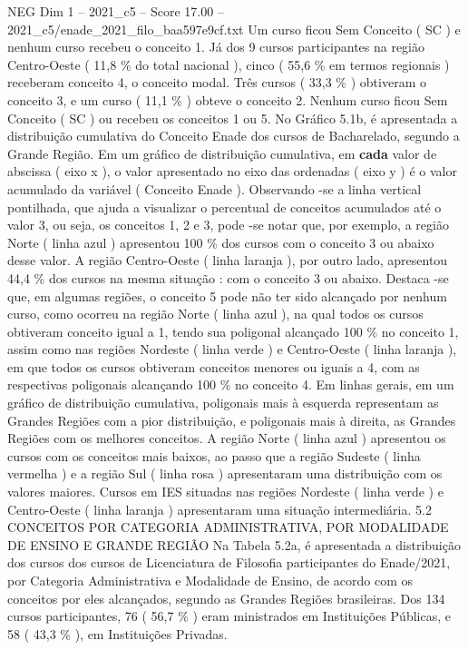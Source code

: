 \begin{textsample}{NEG Dim 1 – 2021\_c5 – Score 17.00 – 2021\_c5/enade\_2021\_filo\_baa597e9cf.txt}
Um curso ficou Sem Conceito ( SC ) e nenhum curso recebeu o conceito 1.
Já dos 9 cursos participantes na região Centro-Oeste ( 11,8 \% do total nacional ), cinco ( 55,6 \% em termos regionais ) receberam conceito 4, o conceito modal.
Três cursos ( 33,3 \% ) obtiveram o conceito 3, e um curso ( 11,1 \% ) obteve o conceito 2.
Nenhum curso ficou Sem Conceito ( SC ) ou recebeu os conceitos 1 ou 5.
No Gráfico 5.1b, é apresentada a distribuição cumulativa do Conceito Enade dos cursos de Bacharelado, segundo a Grande Região.
Em um gráfico de distribuição cumulativa, em \textbf{cada} valor de abscissa ( eixo x ), o valor apresentado no eixo das ordenadas ( eixo y ) é o valor acumulado da variável ( Conceito Enade ).
Observando -se a linha vertical pontilhada, que ajuda a visualizar o percentual de conceitos acumulados até o valor 3, ou seja, os conceitos 1, 2 e 3, pode -se notar que, por exemplo, a região Norte ( linha azul ) apresentou 100 \% dos cursos com o conceito 3 ou abaixo desse valor.
A região Centro-Oeste ( linha laranja ), por outro lado, apresentou 44,4 \% dos cursos na mesma situação : com o conceito 3 ou abaixo.
Destaca -se que, em algumas regiões, o conceito 5 pode não ter sido alcançado por nenhum curso, como ocorreu na região Norte ( linha azul ), na qual todos os cursos obtiveram conceito igual a 1, tendo sua poligonal alcançado 100 \% no conceito 1, assim como nas regiões Nordeste ( linha verde ) e Centro-Oeste ( linha laranja ), em que todos os cursos obtiveram conceitos menores ou iguais a 4, com as respectivas poligonais alcançando 100 \% no conceito 4.
Em linhas gerais, em um gráfico de distribuição cumulativa, poligonais mais à esquerda representam as Grandes Regiões com a pior distribuição, e poligonais mais à direita, as Grandes Regiões com os melhores conceitos.
A região Norte ( linha azul ) apresentou os cursos com os conceitos mais baixos, ao passo que a região Sudeste ( linha vermelha ) e a região Sul ( linha rosa ) apresentaram uma distribuição com os valores maiores.
Cursos em IES situadas nas regiões Nordeste ( linha verde ) e Centro-Oeste ( linha laranja ) apresentaram uma situação intermediária. 5.2 CONCEITOS POR CATEGORIA ADMINISTRATIVA, POR MODALIDADE DE ENSINO E GRANDE REGIÃO Na Tabela 5.2a, é apresentada a distribuição dos cursos dos cursos de Licenciatura de Filosofia participantes do Enade/2021, por Categoria Administrativa e Modalidade de Ensino, de acordo com os conceitos por eles alcançados, segundo as Grandes Regiões brasileiras.
Dos 134 cursos participantes, 76 ( 56,7 \% ) eram ministrados em Instituições Públicas, e 58 ( 43,3 \% ), em Instituições Privadas.

\end{textsample}

